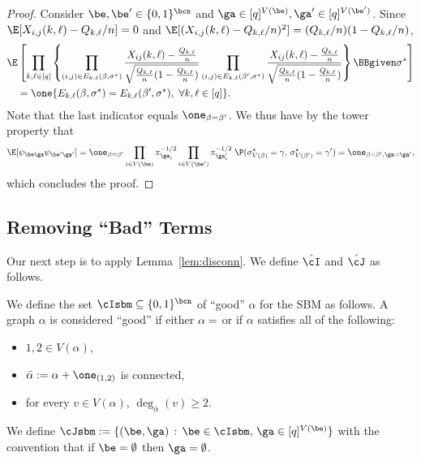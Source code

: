 \documentclass[11pt]{article}
\begin{document}
\begin{proof}
    Consider $\be,\be^\prime\in \{0,1\}^{\bcn}$ and $\ga\in [q]^{V(\be)}, \ga^\prime \in [q]^{V(\be^\prime)}$. Since $\E[X_{i,j}(k,\ell)-Q_{k,\ell}/n]=0$ and $\E[(X_{i,j}(k,\ell)-Q_{k,\ell}/n)^2]=(Q_{k,\ell}/n)(1-Q_{k,\ell}/n)$,
    \[
    \begin{split}
    &\E\left[\prod_{k,\ell\in[q]}\left\{\prod_{(i,j)\in E_{k,\ell}(\beta,\sigma^\star)}\frac{X_{ij}(k,\ell)-\frac{Q_{k,\ell}}{n}}{\sqrt{\frac{Q_{k,\ell}}{n}(1-\frac{Q_{k,\ell}}{n})}}\prod_{(i,j)\in E_{k,\ell}(\beta^\prime,\sigma^\star)}\frac{X_{ij}(k,\ell)-\frac{Q_{k,\ell}}{n}}{\sqrt{\frac{Q_{k,\ell}}{n}(1-\frac{Q_{k,\ell}}{n})}}\right\}\BBgiven \sigma^\star\right]\\
    &\quad=\one\{E_{k,\ell}(\beta,\sigma^\star)=E_{k,\ell}(\beta^\prime,\sigma^\star),~\forall k,\ell\in [q]\}.
    \end{split}
    \]
    Note that the last indicator equals $\one_{\beta=\beta^\prime}$.
    We thus have by the tower property that
    \[
    \E [\psi_{\be\ga}\psi_{\be^\prime \ga^\prime}]=\one_{\beta=\beta^\prime}\prod_{i\in V(\be)}\pi_{\ga_i}^{-1/2}\prod_{i\in V(\be^\prime)}\pi_{\ga^\prime_i}^{-1/2}\;\P(\sigma^\star_{V(\beta)}=\gamma,\, \sigma^\star_{V(\beta^\prime)}=\gamma^\prime)=\one_{\beta=\beta^\prime, \ga=\ga^\prime},
    \]
    which concludes the proof.
\end{proof}

\subsection{Removing ``Bad'' Terms}

Our next step is to apply Lemma~\ref{lem:disconn}. We define $\hat\cI$ and $\hat\cJ$ as follows.
\begin{definition}
\label{def:good:SBM}
    We define the set $\cIsbm\subseteq \{0,1\}^{\bcn}$ of ``good'' $\alpha$ for the SBM as follows. A graph $\alpha$ is considered ``good'' if either $\alpha = \empty$ or if $\alpha$ satisfies all of the following:
    \begin{itemize}
        \item $1,2 \in V(\alpha)$,
        \item $\bar\alpha := \alpha + \one_{(1,2)}$ is connected,
        \item for every $v \in V(\alpha)$, $\deg_{\bar\alpha}(v) \ge 2$.
    \end{itemize}
    We define $\cJsbm:=\{(\be,\ga) \,:\, \be\in \cIsbm,\, \ga\in [q]^{V(\be)}\}$ with the convention that if $\be=\emptyset$ then $\ga=\emptyset$.
\end{definition}
\end{document}
